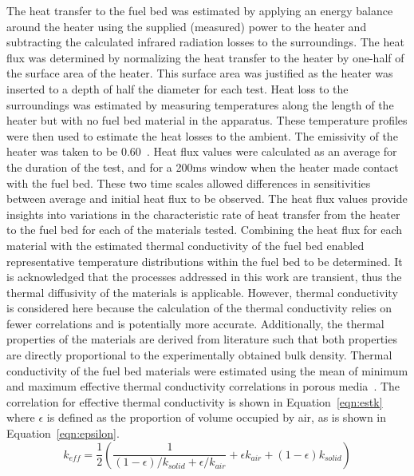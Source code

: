        
    The heat transfer to the fuel bed was estimated by applying an energy balance around the heater using the supplied (measured) power to the heater and subtracting the calculated infrared radiation losses to the surroundings. The heat flux was determined by normalizing the heat transfer to the heater by one-half of the surface area of the heater.  This surface area was justified as the heater was inserted to a depth of half the diameter for each test. Heat loss to the surroundings was estimated by measuring temperatures along the length of the heater but with no fuel bed material in the apparatus. These temperature profiles were then used to estimate the heat losses to the ambient. The emissivity of the heater was taken to be 0.60~\cite{Watlow2020}. Heat flux values were calculated as an average for the duration of the test, and for a 200\si{\milli\second} window when the heater made contact with the fuel bed. These two time scales allowed differences in sensitivities between average and initial heat flux to be observed. The heat flux values provide insights into variations in the characteristic rate of heat transfer from the heater to the fuel bed for each of the materials tested. Combining the heat flux for each material with the estimated thermal conductivity of the fuel bed enabled representative temperature distributions within the fuel bed to be determined. It is acknowledged that the processes addressed in this work are transient, thus the thermal diffusivity of the materials is applicable. However, thermal conductivity is considered here because the calculation of the thermal conductivity relies on fewer correlations and is potentially more accurate. Additionally, the thermal properties of the materials are derived from literature such that both properties are directly proportional to the experimentally obtained bulk density. Thermal conductivity of the fuel bed materials were estimated using the mean of minimum and maximum effective thermal conductivity correlations in porous media~\cite{bergman2011fundamentals}. The correlation for effective thermal conductivity is shown in Equation~\ref{eqn:estk} where $\epsilon$ is defined as the proportion of volume occupied by air, as is shown in Equation~\ref{eqn:epsilon}. 
        \begin{equation}
            k_{eff} = \frac{1}{2} \left(\frac{1}{\left( 1 - \epsilon \right)/k_{solid} + \epsilon/k_{air}} +  \epsilon k_{air} + \left(1-\epsilon \right) k_{solid} \right)
            \label{eqn:estk}
        \end{equation}
